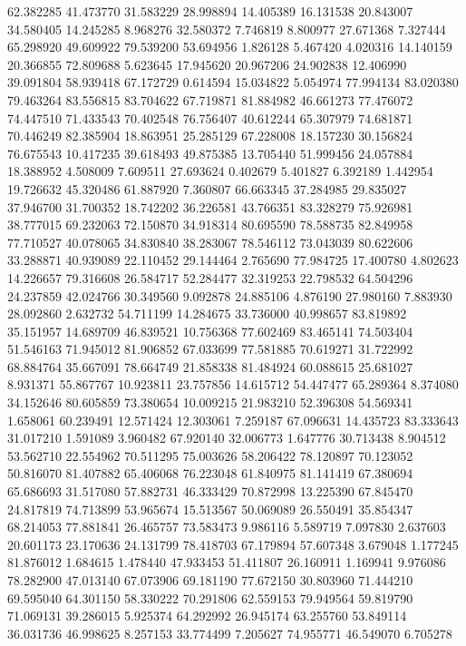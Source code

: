 62.382285
41.473770
31.583229
28.998894
14.405389
16.131538
20.843007
34.580405
14.245285
8.968276
32.580372
7.746819
8.800977
27.671368
7.327444
65.298920
49.609922
79.539200
53.694956
1.826128
5.467420
4.020316
14.140159
20.366855
72.809688
5.623645
17.945620
20.967206
24.902838
12.406990
39.091804
58.939418
67.172729
0.614594
15.034822
5.054974
77.994134
83.020380
79.463264
83.556815
83.704622
67.719871
81.884982
46.661273
77.476072
74.447510
71.433543
70.402548
76.756407
40.612244
65.307979
74.681871
70.446249
82.385904
18.863951
25.285129
67.228008
18.157230
30.156824
76.675543
10.417235
39.618493
49.875385
13.705440
51.999456
24.057884
18.388952
4.508009
7.609511
27.693624
0.402679
5.401827
6.392189
1.442954
19.726632
45.320486
61.887920
7.360807
66.663345
37.284985
29.835027
37.946700
31.700352
18.742202
36.226581
43.766351
83.328279
75.926981
38.777015
69.232063
72.150870
34.918314
80.695590
78.588735
82.849958
77.710527
40.078065
34.830840
38.283067
78.546112
73.043039
80.622606
33.288871
40.939089
22.110452
29.144464
2.765690
77.984725
17.400780
4.802623
14.226657
79.316608
26.584717
52.284477
32.319253
22.798532
64.504296
24.237859
42.024766
30.349560
9.092878
24.885106
4.876190
27.980160
7.883930
28.092860
2.632732
54.711199
14.284675
33.736000
40.998657
83.819892
35.151957
14.689709
46.839521
10.756368
77.602469
83.465141
74.503404
51.546163
71.945012
81.906852
67.033699
77.581885
70.619271
31.722992
68.884764
35.667091
78.664749
21.858338
81.484924
60.088615
25.681027
8.931371
55.867767
10.923811
23.757856
14.615712
54.447477
65.289364
8.374080
34.152646
80.605859
73.380654
10.009215
21.983210
52.396308
54.569341
1.658061
60.239491
12.571424
12.303061
7.259187
67.096631
14.435723
83.333643
31.017210
1.591089
3.960482
67.920140
32.006773
1.647776
30.713438
8.904512
53.562710
22.554962
70.511295
75.003626
58.206422
78.120897
70.123052
50.816070
81.407882
65.406068
76.223048
61.840975
81.141419
67.380694
65.686693
31.517080
57.882731
46.333429
70.872998
13.225390
67.845470
24.817819
74.713899
53.965674
15.513567
50.069089
26.550491
35.854347
68.214053
77.881841
26.465757
73.583473
9.986116
5.589719
7.097830
2.637603
20.601173
23.170636
24.131799
78.418703
67.179894
57.607348
3.679048
1.177245
81.876012
1.684615
1.478440
47.933453
51.411807
26.160911
1.169941
9.976086
78.282900
47.013140
67.073906
69.181190
77.672150
30.803960
71.444210
69.595040
64.301150
58.330222
70.291806
62.559153
79.949564
59.819790
71.069131
39.286015
5.925374
64.292992
26.945174
63.255760
53.849114
36.031736
46.998625
8.257153
33.774499
7.205627
74.955771
46.549070
6.705278
